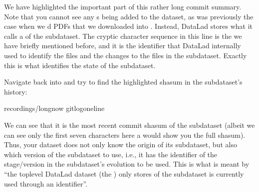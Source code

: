 \sphinxAtStartPar
We have highlighted the important part of this rather long commit summary.
Note that you cannot see any s being added to the dataset,
as was previously the case when we d PDFs that we
downloaded into . Instead,
DataLad stores what it calls a  of the subdataset.
The cryptic character sequence in this line is the {\hyperref[\detokenize{glossary:term-shasum}]{}} we have briefly
mentioned before, and it is the identifier that
DataLad internally used to identify the files and the changes to the files in the subdataset. Exactly this
{\hyperref[\detokenize{glossary:term-shasum}]{}} is what identifies the state of the subdataset.

\sphinxAtStartPar
Navigate back into  and try to find the highlighted shasum in the
subdataset’s history:

%
\begin{sphinxVerbatim}[commandchars=\\\{\}]
recordings/longnow
gitlog\PYGZhy{}\PYGZhy{}oneline
\end{sphinxVerbatim}
\sphinxresetverbatimhllines

\sphinxAtStartPar
We can see that it is the most recent commit shasum of the subdataset
(albeit we can see only the first seven characters here \textendash{} a 
would show you the full shasum). Thus, your dataset does not only know the origin
of its subdataset, but also which version of the subdataset to use,
i.e., it has the identifier of the stage/version in the subdataset’s evolution to be used.
This is what is meant by “the top\sphinxhyphen{}level DataLad dataset (the ) only stores
 of the subdataset is currently used through an identifier”.

